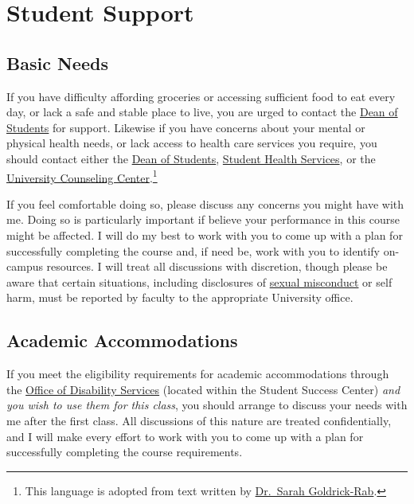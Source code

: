 \documentclass[
]{book}
\begin{document}
\hypertarget{student-support}{%
\section{Student Support}\label{student-support}}

\hypertarget{basic-needs}{%
\subsection{Basic Needs}\label{basic-needs}}

If you have difficulty affording groceries or accessing sufficient food to eat every day, or lack a safe and stable place to live, you are urged to contact the \href{https://www.slu.edu/student-development/dean-of-students/index.php}{Dean of Students} for support. Likewise if you have concerns about your mental or physical health needs, or lack access to health care services you require, you should contact either the \href{https://www.slu.edu/student-development/dean-of-students/index.php}{Dean of Students}, \href{https://www.slu.edu/life-at-slu/student-health/index.php}{Student Health Services}, or the \href{https://www.slu.edu/life-at-slu/university-counseling/index.php}{University Counseling Center}.\footnote{This language is adopted from text written by \href{https://medium.com/@saragoldrickrab/basic-needs-security-and-the-syllabus-d24cc7afe8c9}{Dr.~Sarah Goldrick-Rab}.}

If you feel comfortable doing so, please discuss any concerns you might have with me. Doing so is particularly important if believe your performance in this course might be affected. I will do my best to work with you to come up with a plan for successfully completing the course and, if need be, work with you to identify on-campus resources. I will treat all discussions with discretion, though please be aware that certain situations, including disclosures of \href{/syllabus/harassment-and-title-ix.html}{sexual misconduct} or self harm, must be reported by faculty to the appropriate University office.

\hypertarget{academic-accommodations}{%
\subsection{Academic Accommodations}\label{academic-accommodations}}

If you meet the eligibility requirements for academic accommodations through the \href{https://www.slu.edu/life-at-slu/student-success-center/disability-services/index.php}{Office of Disability Services} (located within the Student Success Center) \emph{and you wish to use them for this class}, you should arrange to discuss your needs with me after the first class. All discussions of this nature are treated confidentially, and I will make every effort to work with you to come up with a plan for successfully completing the course requirements.
\end{document}

